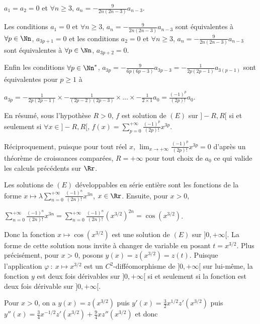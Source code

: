 {\begin{enumerate}
{\begin{center}
$a_1=a_2=0$ et $\forall n\geqslant3$, $a_n=- \frac{9}{2n(2n-3)}a_{n-3}$.
\end{center}

Les conditions $a_1=0$ et $\forall n\geqslant3$, $a_n=- \frac{9}{2n(2n-3)}a_{n-3}$ sont équivalentes à $\forall p\in\Nn$, $a_{3p+1}=0$ et les conditions $a_2=0$ et $\forall n\geqslant3$, $a_n=- \frac{9}{2n(2n-3)}a_{n-3}$ sont équivalentes à $\forall p\in\Nn$, $a_{3p+2}=0$.

Enfin les conditions $\forall p\in\Nn^*$, $a_{3p}=- \frac{9}{6p(6p-3)}a_{3p-3}=- \frac{1}{2p(2p-1)}a_{3(p-1)}$ sont équivalentes pour $p\geqslant1$ à

\begin{center}
$a_{3p}=- \frac{1}{2p(2p-1)}\times- \frac{1}{(2p-2)(2p-3)}\times\ldots\times- \frac{1}{2\times1}a_0= \frac{(-1)^p}{(2p)!}a_0$.
\end{center}

En résumé, sous l'hypothèse $R>0$, $f$ est solution de $(E)$ sur $]-R,R[$ si et seulement si $\forall x\in]-R,R[$, $f(x)=\sum_{p=0}^{+\infty} \frac{(-1)^p}{(2p)!}x^{3p}$.

Réciproquement, puisque pour tout réel $x$, $\lim_{x \rightarrow +\infty} \frac{(-1)^p}{(2p)!}x^{3p}=0$ d'après un théorème de croissances comparées, $R=+\infty$ pour tout choix de $a_0$ ce qui valide les calculs précédents sur $\Rr$.

Les solutions de $(E)$ développables en série entière sont les fonctions de la forme $x\mapsto\lambda\sum_{n=0}^{+\infty} \frac{(-1)^n}{(2n)!}x^{3n}$, $x\in\Rr$. Ensuite, pour $x>0$,

\begin{center}
$\sum_{n=0}^{+\infty} \frac{(-1)^n}{(2n)!}x^{3n}=\sum_{n=0}^{+\infty} \frac{(-1)^n}{(2n)!}(x^{3/2})^{2n}=\cos\left(x^{3/2}\right)$.
\end{center}

Donc la fonction $x\mapsto\cos\left(x^{3/2}\right)$ est une solution de $(E)$ sur $]0,+\infty[$. La forme de cette solution nous invite à changer de variable en posant $t=x^{3/2}$. Plus précisément, pour $x>0$, posons $y(x)=z(x^{3/2})=z(t)$. Puisque l'application $\varphi~:~x\mapsto x^{3/2}$ est un $C^2$-difféomorphisme de $]0,+\infty[$ sur lui-même, la fonction $y$ est deux fois dérivables sur $]0,+\infty[$ si et seulement si la fonction est deux fois dérivable sur $]0,+\infty[$.

Pour $x>0$, on a $y(x)=z(x^{3/2})$ puis $y'(x)= \frac{3}{2}x^{1/2}z'(x^{3/2})$ puis $y''(x)= \frac{3}{4}x^{-1/2}z'(x^{3/2})+ \frac{9}{4}xz''(x^{3/2})$ et donc

}
\end{enumerate}}
